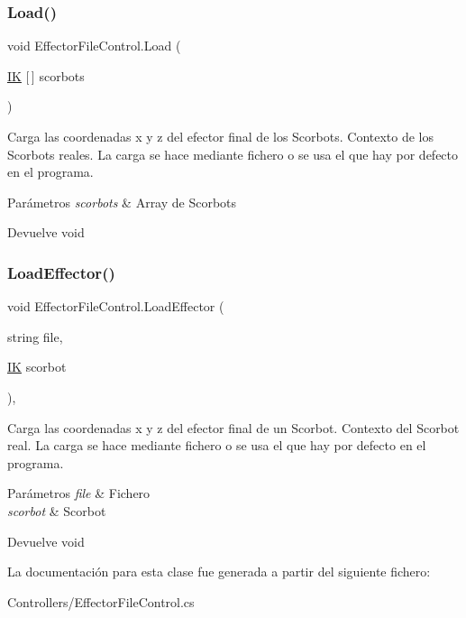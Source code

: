 \subsubsection{\texorpdfstring{Load()}{Load()}}
{\footnotesize\ttfamily void Effector\+File\+Control.\+Load (\begin{DoxyParamCaption}\item[{\mbox{\hyperlink{class_i_k}{IK}} \mbox{[}$\,$\mbox{]}}]{scorbots }\end{DoxyParamCaption})\hspace{0.3cm}{\ttfamily [inline]}}

Carga las coordenadas x y z del efector final de los Scorbots. Contexto de los Scorbots reales. La carga se hace mediante fichero o se usa el que hay por defecto en el programa. 
\begin{DoxyParams}{Parámetros}
{\em scorbots} & Array de Scorbots \\
\hline
\end{DoxyParams}
\begin{DoxyReturn}{Devuelve}
void 
\end{DoxyReturn}
\mbox{\label{class_effector_file_control_ab74d54146539af59f39130f83376d5b3}} 
\subsubsection{\texorpdfstring{LoadEffector()}{LoadEffector()}}
{\footnotesize\ttfamily void Effector\+File\+Control.\+Load\+Effector (\begin{DoxyParamCaption}\item[{string}]{file,  }\item[{\mbox{\hyperlink{class_i_k}{IK}}}]{scorbot }\end{DoxyParamCaption})\hspace{0.3cm}{\ttfamily [inline]}, {\ttfamily [private]}}

Carga las coordenadas x y z del efector final de un Scorbot. Contexto del Scorbot real. La carga se hace mediante fichero o se usa el que hay por defecto en el programa. 
\begin{DoxyParams}{Parámetros}
{\em file} & Fichero \\
\hline
{\em scorbot} & Scorbot \\
\hline
\end{DoxyParams}
\begin{DoxyReturn}{Devuelve}
void 
\end{DoxyReturn}


La documentación para esta clase fue generada a partir del siguiente fichero\+:\begin{DoxyCompactItemize}
\item 
Controllers/Effector\+File\+Control.\+cs\end{DoxyCompactItemize}
